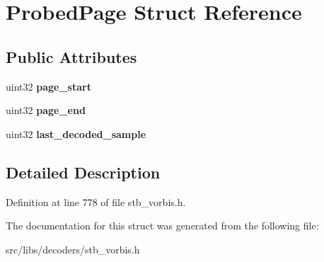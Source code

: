 \hypertarget{structProbedPage}{\section{Probed\-Page Struct Reference}
\label{structProbedPage}
}
\subsection*{Public Attributes}
\begin{DoxyCompactItemize}
\item 
\hypertarget{structProbedPage_aaa50c148dd63b1c5582963aab9a987d9}{uint32 {\bfseries page\-\_\-start}}\label{structProbedPage_aaa50c148dd63b1c5582963aab9a987d9}

\item 
\hypertarget{structProbedPage_a70bebe23790fc29c0e904c43e26aac1a}{uint32 {\bfseries page\-\_\-end}}\label{structProbedPage_a70bebe23790fc29c0e904c43e26aac1a}

\item 
\hypertarget{structProbedPage_ad0e2a35e768907ee5f1b7ef9fed20e81}{uint32 {\bfseries last\-\_\-decoded\-\_\-sample}}\label{structProbedPage_ad0e2a35e768907ee5f1b7ef9fed20e81}

\end{DoxyCompactItemize}


\subsection{Detailed Description}


Definition at line 778 of file stb\-\_\-vorbis.\-h.



The documentation for this struct was generated from the following file\-:\begin{DoxyCompactItemize}
\item 
src/libs/decoders/stb\-\_\-vorbis.\-h\end{DoxyCompactItemize}
